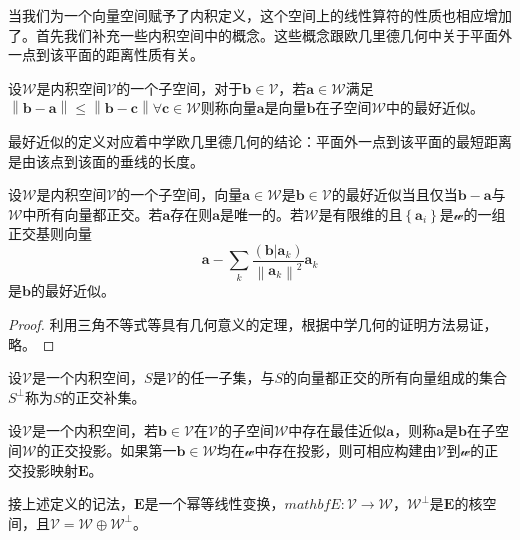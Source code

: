 \documentclass[main.tex]{subfiles}
\begin{document}
当我们为一个向量空间赋予了内积定义，这个空间上的线性算符的性质也相应增加了。首先我们补充一些内积空间中的概念。这些概念跟欧几里德几何中关于平面外一点到该平面的距离性质有关。

\begin{definition}[最好近似]
设$\mathcal{W}$是内积空间$\mathcal{V}$的一个子空间，对于$\mathbf{b}\in\mathcal{V}$，若$\mathbf{a}\in\mathcal{W}$满足$\left\|\mathbf{b}-\mathbf{a}\right\|\leq\left\|\mathbf{b}-\mathbf{c}\right\|\forall\mathbf{c}\in\mathcal{W}$则称向量$\mathbf{a}$是向量$\mathbf{b}$在子空间$\mathcal{W}$中的最好近似。
\end{definition}

最好近似的定义对应着中学欧几里德几何的结论：平面外一点到该平面的最短距离是由该点到该面的垂线的长度。

\begin{theorem}
设$\mathcal{W}$是内积空间$\mathcal{V}$的一个子空间，向量$\mathbf{a}\in\mathcal{W}$是$\mathbf{b}\in\mathcal{V}$的最好近似当且仅当$\mathbf{b}-\mathbf{a}$与$\mathcal{W}$中所有向量都正交。若$\mathbf{a}$存在则$\mathbf{a}$是唯一的。若$\mathcal{W}$是有限维的且$\left\{\mathbf{a}_i\right\}$是$\mathcal{w}$的一组正交基则向量
\[
\mathbf{a}-\sum_k\frac{\left(\mathbf{b}|\mathbf{a}_k\right)}{\left\|\mathbf{a}_k\right\|^2}\mathbf{a}_k\]
是$\mathbf{b}$的最好近似。
\end{theorem}
\begin{proof}
利用三角不等式等具有几何意义的定理，根据中学几何的证明方法易证，略。
\end{proof}

\begin{definition}[正交补集]
设$\mathcal{V}$是一个内积空间，$S$是$\mathcal{V}$的任一子集，与$S$的向量都正交的所有向量组成的集合$S^\perp$称为$S$的正交补集。
\end{definition}

\begin{definition}[正交投影]
设$\mathcal{V}$是一个内积空间，若$\mathbf{b}\in\mathcal{V}$在$\mathcal{V}$的子空间$\mathcal{W}$中存在最佳近似$\mathbf{a}$，则称$\mathbf{a}$是$\mathbf{b}$在子空间$\mathcal{W}$的正交投影。如果第一$\mathbf{b}\in\mathcal{W}$均在$\mathcal{w}$中存在投影，则可相应构建由$\mathcal{V}$到$\mathcal{w}$的正交投影映射$\mathbf{E}$。
\end{definition}

\begin{theorem}
接上述定义的记法，$\mathbf{E}$是一个幂等线性变换，$mathbf{E}:\mathcal{V}\rightarrow\mathcal{W}$，$\mathcal{W}^\perp$是$\mathbf{E}$的核空间，且$\mathcal{V}=\mathcal{W}\oplus\mathcal{W}^\perp$。
\end{theorem}
\end{document}
